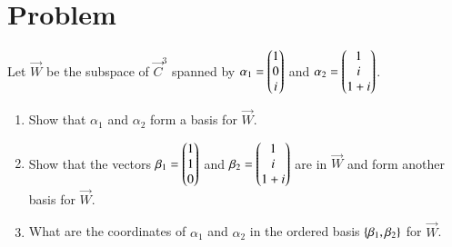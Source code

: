 \documentclass[journal,12pt,twocolumn]{IEEEtran}
\begin{document}
\section{Problem}
Let $\vec{W}$ be the subspace of $\vec{C}^3$ spanned by 
$\alpha_1=\begin{pmatrix}1\\0\\i\end{pmatrix}$ and $\alpha_2=\begin{pmatrix}1\\i\\1+i\end{pmatrix}$.
\begin{enumerate}[label=\emph{\alph*)}]
	\item Show that $\alpha_1$ and $\alpha_2$ form a basis for $\vec{W}$.\\
	\item Show that the vectors $\beta_1=\begin{pmatrix}1\\1\\0\end{pmatrix}$ and 
		$\beta_2=\begin{pmatrix}1\\i\\1+i\end{pmatrix}$ are in $\vec{W}$ and form another
		basis for $\vec{W}$. \\
	\item What are the coordinates of $\alpha_1$ and $\alpha_2$ in the
		ordered basis $\left\{\beta_1, \beta_2\right\} $ for $\vec{W}$.
\end{enumerate}
\end{document}
